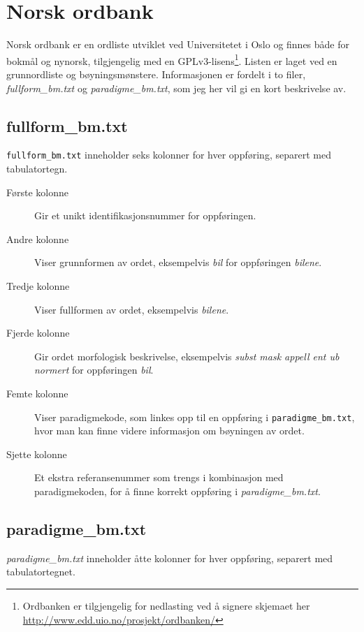 \section{Norsk ordbank}

Norsk ordbank er en ordliste utviklet ved Universitetet i Oslo og finnes både for bokmål og nynorsk, tilgjengelig med en GPLv3-lisens\footnote{Ordbanken er tilgjengelig for nedlasting ved å signere skjemaet her \url{http://www.edd.uio.no/prosjekt/ordbanken/}}. Listen er laget ved en grunnordliste og bøyningsmønstere. Informasjonen er fordelt i to filer, \textit{fullform\_bm.txt} og \textit{paradigme\_bm.txt}, som jeg her vil gi en kort beskrivelse av.

\subsection{fullform\_bm.txt}

\texttt{fullform\_bm.txt} inneholder seks kolonner for hver oppføring, separert med tabulatortegn.

\begin{description}
\item[Første kolonne] Gir et unikt identifikasjonsnummer for oppføringen.
\item[Andre kolonne] Viser grunnformen av ordet, eksempelvis \textit{bil} for oppføringen \textit{bilene}.
\item[Tredje kolonne] Viser fullformen av ordet, eksempelvis \textit{bilene}.
\item[Fjerde kolonne] Gir ordet morfologisk beskrivelse, eksempelvis \textit{subst mask appell ent ub normert} for oppføringen \textit{bil}. 
\item[Femte kolonne] Viser paradigmekode, som linkes opp til en oppføring i \texttt{paradigme\_bm.txt}, hvor man kan finne videre informasjon om bøyningen av ordet.
\item[Sjette kolonne] Et ekstra referansenummer som trengs i kombinasjon med paradigmekoden, for å finne korrekt oppføring i \textit{paradigme\_bm.txt}. 
\end{description}

\subsection{paradigme\_bm.txt}

\textit{paradigme\_bm.txt} inneholder åtte kolonner for hver oppføring, separert med tabulatortegnet.

